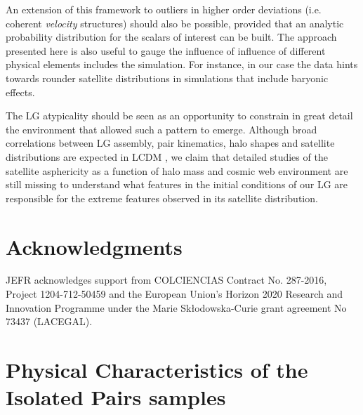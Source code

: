 \documentclass[a4paper,fleqn,usenatbib]{mnras}
\begin{document}
An extension of this framework to outliers in higher order deviations
(i.e. coherent \emph{velocity} structures) should also be possible, 
provided that an analytic probability distribution for the scalars of
interest can be built.  
The approach presented here is also useful to gauge the influence of 
influence of different physical elements includes the simulation. 
For instance, in our case the data hints towards rounder satellite
distributions in simulations that include baryonic effects.  

The LG atypicality should be seen as an opportunity to constrain in
great detail the environment that allowed such a pattern to emerge. 
Although broad correlations between LG assembly, pair kinematics, halo
shapes and satellite distributions are expected in LCDM
\citep{2011MNRAS.417.1434F,2014MNRAS.443.1090F,2015ApJ...799...45F,2015MNRAS.452.1052L},
we claim that detailed studies of the satellite asphericity as a
function of halo mass and cosmic web environment are still missing to
understand what features in the initial conditions of our LG are
responsible for the extreme features observed in its satellite
distribution. 

\section*{Acknowledgments} 
JEFR acknowledges support from COLCIENCIAS Contract No. 287-2016,
Project 1204-712-50459 and the European Union's Horizon 2020 Research and Innovation
Programme under the Marie Sk\l{}odowska-Curie grant agreement No 73437
(LACEGAL).   
  




\appendix


\section{Physical Characteristics of the Isolated Pairs samples}
\label{appendix:physical}
\end{document}
